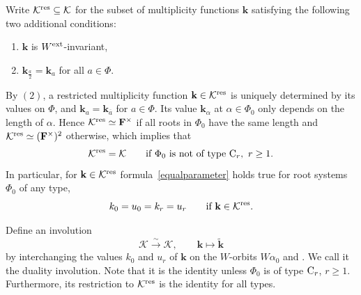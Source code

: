 Write $\mathcal{K}^{{\rm res}}\subseteq\mathcal{K}$ for the subset of multiplicity functions $\mathbf{k}$ satisfying the following
two additional conditions:
\begin{enumerate}\itemsep=0pt
\item[$ (1)$] $\mathbf{k}$ is $W^{\textup{ext}}$-invariant,
\item[$(2)$] $\mathbf{k}_{\frac{a}{2}}=\mathbf{k}_a$ for all $a\in\Phi$.
\end{enumerate}
By $(2)$, a restricted multiplicity function $\mathbf{k}\in\mathcal{K}^{{\rm res}}$ is uniquely determined by its values on $\Phi$, and $\mathbf{k}_a=\mathbf{k}_{\overline{a}}$ for $a\in\Phi$. Its value $\mathbf{k}_\alpha$ at $\alpha\in\Phi_0$ only depends on the length of $\alpha$. Hence $\mathcal{K}^{{\rm res}}\simeq\mathbf{F}^\times$ if all roots in $\Phi_0$ have the same length and
$\mathcal{K}^{{\rm res}}\simeq (\mathbf{F}^\times)^2$ otherwise, which implies that
\[
\mathcal{K}^{{\rm res}}=\mathcal{K}\qquad \textup{if }  \Phi_0 \ \textup{is not of type}\ {\rm C}_r,\ r\geq 1.
\]
In particular, for $\mathbf{k}\in\mathcal{K}^{{\rm res}}$ formula~\eqref{equalparameter} holds true for root systems $\Phi_0$ of any type,
\[
k_0=u_0=k_r=u_r\qquad \text{if}\ \mathbf{k}\in\mathcal{K}^{{\rm res}}.
\]

Define an involution
\begin{equation*}%
\mathcal{K}\overset{\sim}{\longrightarrow}\mathcal{K},\qquad \mathbf{k}\mapsto \widetilde{\mathbf{k}}
\end{equation*}
by interchanging the values $k_0$ and $u_r$ of $\mathbf{k}$ on the $W$-orbits $W\alpha_0$ and . We call it the duality involution.
Note that it is the identity unless $\Phi_0$ is of type ${\rm C}_r$, $r\geq 1$. Furthermore, its restriction to $\mathcal{K}^{{\rm res}}$ is the identity for all types.

